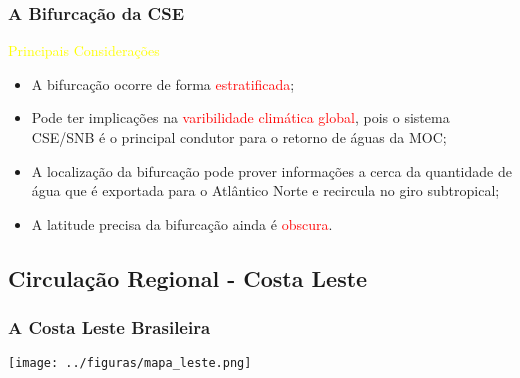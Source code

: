 \documentclass[pdftex]{beamer}
\begin{document}
\frame
{
  \frametitle{A Bifurcação da CSE}
\begin{block}{\textcolor{yellow}{Principais Considerações}}
\begin{itemize}
\vspace{0.3cm}
      \item A bifurcação ocorre de forma \textcolor{red}{estratificada};
\vspace{0.5cm}
      \item Pode ter implicações na \textcolor{red}{varibilidade climática global}, pois o sistema 
            CSE/SNB é o principal condutor para o retorno de águas da MOC;
\vspace{0.5cm}
      \item A localização da bifurcação pode prover informações a cerca da quantidade
            de  água que é exportada para o Atlântico Norte e recircula  no giro subtropical;
\vspace{0.5cm}
      \item A latitude precisa da bifurcação ainda é \textcolor{red}{obscura}.
    \end{itemize}
\vspace{0.1cm}
\end{block}
}


\subsection[Circulação Regional]{Circulação Regional - Costa Leste}

\frame
{
  \frametitle{A Costa Leste Brasileira}

\texttt{[image: ../figuras/mapa\_leste.png]}

}
\end{document}
